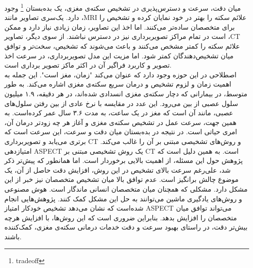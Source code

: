 میان دقت، سرعت و دسترس‌پذیری در تشخیص سکته‌ی مغزی، یک بده‌بستان
\footnote{tradeoff}
وجود دارد.
یک‌سری تصاویر مانند ،MRI علائم سکته را بهتر در خود نمایان کرده و تشخیص را برای متخصصان ساده‌تر می‌کنند.
اما اخذ این تصاویر، زمان زیادی نیاز دارد و ممکن است در تمام مراکز تصویر‌برداری نیز در دسترس نباشند.
از سوی دیگر، تصاویر ،CT علائم سکته را کمتر مشخص می‌کنند و باعث می‌شوند که تشخیص، سخت‌تر و توافق میان تشخیص‌دهندگان کمتر شود.
اما مزیت این مدل تصویربرداری، در سرعت اخذ تصویر و کاربرد فراگیر آن در اکثر ماکز تصویر برداری است.\\
اصطلاحی در این حوزه وجود دارد که عنوان می‌کند "زمان، مغز است". 
این جمله به اهمیت زمان و لزوم تشخیص و درمان سریع سکته‌ی مغزی اشاره می‌کند.
به طور متوسط، در بیمارانی که دچار سکته‌ی مغزی انسدادی شده‌اند، در هر دقیقه، ۱.۹ میلیون سلول عصبی از بین می‌رود.
این عدد در مقایسه با نرخ عادی از بین رفتن سلول‌های عصبی، مانند آن است که مغز در یک ساعت، به مدت ۳.۶ سال عمر کرده‌است.
به همین جهت، سرعت عمل در تشخیص سکته‌ی مغزی و آغاز هر چه زودتر درمان آن، امری حیاتی است.
در نتیجه در بده‌بستان میان دقت و سرعت، این سرعت است که برتری می‌یابد و تصویربرداری CT و روش‌های تشخیصی مبتنی بر آن را غالب می‌کند.
امتیازدهی ASPECT یک روش تشخیصی مبتنی بر CT است.
به همین دلیل است که پژوهش حول این مسئله، از اهمیت بالایی برخوردار است.
اما همانطور که پیش‌تر ذکر شد، علی‌رغم سرعت بالای تشخیص در این روش، افزایش دقت حاصل از آن، یک موضوع چالش برانگیز است.
عدم توافق بالا میان تشخیص متخصصان نیز خبر از این مشکل دارد.
مشکلی که همچنان میان متخصصان انسانی ماندگار است.
هوش مصنوعی و روش‌های یادگیری ماشین می‌توانند به حل این مشکل کمک کنند.
پژوهش‌هایی انجام شده‌است
که نشان می‌دهد تشخیص خودکار امتیاز ASPECT می‌تواند توافق میان متخصصان را افزایش بدهد.
بنابراین ضروری است که این روش‌ها، با افزایش هرچه بیش‌تر دقت، در راستای بهبود سرعت و دقت خدمات درمانی سکته‌ی مغزی، کمک‌کننده باشند.


